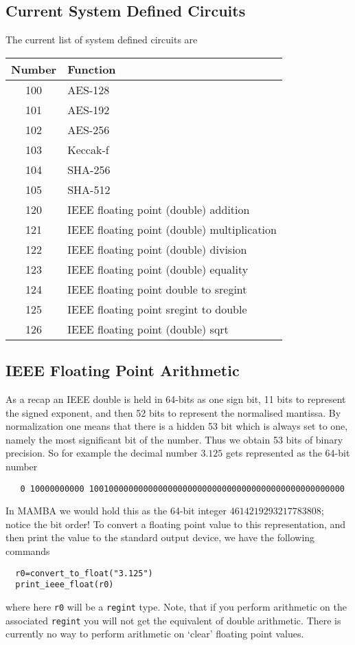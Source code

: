 \subsection{Current System Defined Circuits}
The current list of system defined circuits are
\begin{center}
\begin{tabular}{c|l}
Number & Function \\
\hline
100 & AES-128 \\
101 & AES-192 \\
102 & AES-256 \\
103 & Keccak-f \\
104 & SHA-256 \\
105 & SHA-512 \\
\hline
120 & IEEE floating point (double) addition \\
121 & IEEE floating point (double) multiplication \\
122 & IEEE floating point (double) division \\
123 & IEEE floating point (double) equality \\
124 & IEEE floating point double  to sregint \\
125 & IEEE floating point sregint to double \\
126 & IEEE floating point (double) sqrt \\
\hline
\end{tabular}
\end{center}

\subsection{IEEE Floating Point Arithmetic}
\label{sec:ieee}
As a recap an IEEE double is held in 64-bits as one sign bit,
11 bits to represent the signed exponent, and then 52
bits to represent the normalised mantissa. By normalization
one means that there is a hidden 53 bit which is always set
to one, namely the most significant bit of the number.
Thus we obtain 53 bits of binary precision.
So for example the decimal number $3.125$ gets represented as
the 64-bit number
\begin{lstlisting}
   0 10000000000 1001000000000000000000000000000000000000000000000000
\end{lstlisting}
In MAMBA we would hold this as the 64-bit integer $4614219293217783808$; notice
the bit order!
To convert a floating point value to this representation, and then print
the value to the standard output device, we have the following
commands
\begin{lstlisting}
  r0=convert_to_float("3.125")
  print_ieee_float(r0)
\end{lstlisting}
where here \verb|r0| will be a \verb|regint| type.
Note, that if you perform arithmetic on the associated \verb|regint|
you will not get the equivalent of double arithmetic.
There is currently no way to perform arithmetic on `clear'
floating point values.

